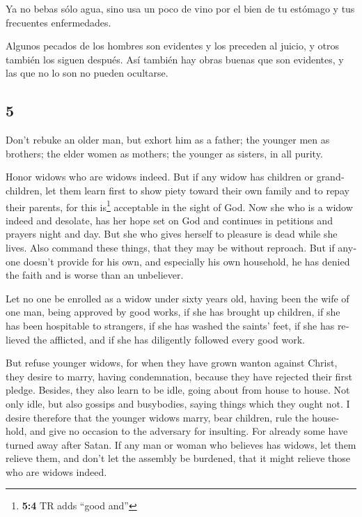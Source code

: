 \begin{paracol}{2}
 Ya no bebas sólo agua, sino usa un poco de vino por el
bien de tu estómago y tus frecuentes enfermedades.

 Algunos pecados de los hombres son evidentes y los
preceden al juicio, y otros también los siguen después. 
Así también hay obras buenas que son evidentes, y las que no lo son no
pueden ocultarse.

\switchcolumn
\begin{otherlanguage}{english}

\hypertarget{section-9}{%
\section{5}\label{section-9}}

 Don't rebuke an older man, but exhort him as a father;
the younger men as brothers;  the elder women as mothers;
the younger as sisters, in all purity.

 Honor widows who are widows indeed.  But if
any widow has children or grandchildren, let them learn first to show
piety toward their own family and to repay their parents, for this
is\footnote{\textbf{5:4} TR adds ``good and''} acceptable in the sight
of God.  Now she who is a widow indeed and desolate, has
her hope set on God and continues in petitions and prayers night and
day.  But she who gives herself to pleasure is dead while
she lives.  Also command these things, that they may be
without reproach.  But if anyone doesn't provide for his
own, and especially his own household, he has denied the faith and is
worse than an unbeliever.

 Let no one be enrolled as a widow under sixty years old,
having been the wife of one man,  being approved by good
works, if she has brought up children, if she has been hospitable to
strangers, if she has washed the saints' feet, if she has relieved the
afflicted, and if she has diligently followed every good work.

 But refuse younger widows, for when they have grown
wanton against Christ, they desire to marry,  having
condemnation, because they have rejected their first pledge.
 Besides, they also learn to be idle, going about from
house to house. Not only idle, but also gossips and busybodies, saying
things which they ought not.  I desire therefore that the
younger widows marry, bear children, rule the household, and give no
occasion to the adversary for insulting.  For already
some have turned away after Satan.  If any man or woman
who believes has widows, let them relieve them, and don't let the
assembly be burdened, that it might relieve those who are widows indeed.


\end{otherlanguage}
\end{paracol}
